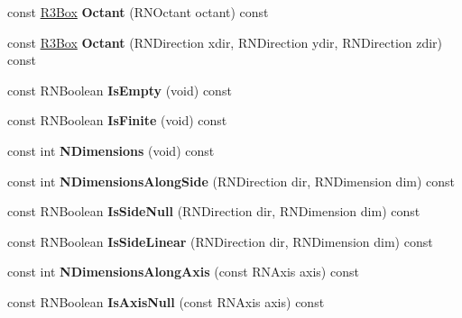 \begin{DoxyCompactItemize}
\item 
const \hyperlink{class_r3_box}{R3\+Box} {\bfseries Octant} (R\+N\+Octant octant) const \hypertarget{class_r3_box_a1cb9a067d49c7e7d1987998fcbedc522}{}\label{class_r3_box_a1cb9a067d49c7e7d1987998fcbedc522}

\item 
const \hyperlink{class_r3_box}{R3\+Box} {\bfseries Octant} (R\+N\+Direction xdir, R\+N\+Direction ydir, R\+N\+Direction zdir) const \hypertarget{class_r3_box_abb3cbfee2595a696b181c76a41db72c1}{}\label{class_r3_box_abb3cbfee2595a696b181c76a41db72c1}

\item 
const R\+N\+Boolean {\bfseries Is\+Empty} (void) const \hypertarget{class_r3_box_ac9551bfaa5d415874142d943ccc06d6f}{}\label{class_r3_box_ac9551bfaa5d415874142d943ccc06d6f}

\item 
const R\+N\+Boolean {\bfseries Is\+Finite} (void) const \hypertarget{class_r3_box_ab36d3ff954a79140c13e160a70217977}{}\label{class_r3_box_ab36d3ff954a79140c13e160a70217977}

\item 
const int {\bfseries N\+Dimensions} (void) const \hypertarget{class_r3_box_a157e73955ce5ff4ed308869ad6ecc8f5}{}\label{class_r3_box_a157e73955ce5ff4ed308869ad6ecc8f5}

\item 
const int {\bfseries N\+Dimensions\+Along\+Side} (R\+N\+Direction dir, R\+N\+Dimension dim) const \hypertarget{class_r3_box_a1f56820fa3d5964423c0893f471ffd24}{}\label{class_r3_box_a1f56820fa3d5964423c0893f471ffd24}

\item 
const R\+N\+Boolean {\bfseries Is\+Side\+Null} (R\+N\+Direction dir, R\+N\+Dimension dim) const \hypertarget{class_r3_box_a4a441f149ae53efab567abf09242325a}{}\label{class_r3_box_a4a441f149ae53efab567abf09242325a}

\item 
const R\+N\+Boolean {\bfseries Is\+Side\+Linear} (R\+N\+Direction dir, R\+N\+Dimension dim) const \hypertarget{class_r3_box_ab108d7e9baae82fbaad1f2af6b8139f7}{}\label{class_r3_box_ab108d7e9baae82fbaad1f2af6b8139f7}

\item 
const int {\bfseries N\+Dimensions\+Along\+Axis} (const R\+N\+Axis axis) const \hypertarget{class_r3_box_a7acfab0b8840942023c1eafa0315e864}{}\label{class_r3_box_a7acfab0b8840942023c1eafa0315e864}

\item 
const R\+N\+Boolean {\bfseries Is\+Axis\+Null} (const R\+N\+Axis axis) const \hypertarget{class_r3_box_ae07f8f7baa6e3d31446dd8f37b0d2f41}{}\label{class_r3_box_ae07f8f7baa6e3d31446dd8f37b0d2f41}


\end{DoxyCompactItemize}
